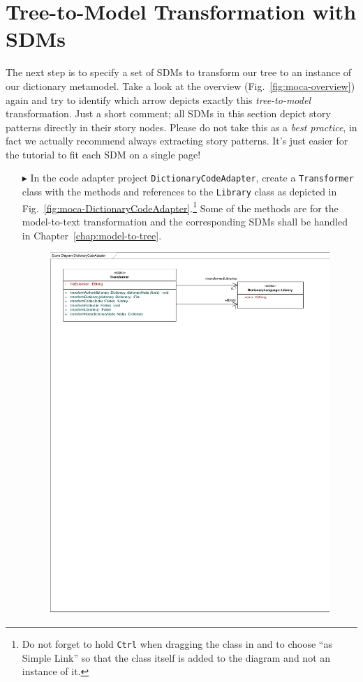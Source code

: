 \section{Tree-to-Model Transformation with SDMs}

The next step is to specify a set of SDMs to transform our tree to an instance of our dictionary metamodel.
Take a look at the overview (Fig.~\ref{fig:moca-overview}) again and try to identify which arrow depicts exactly this \emph{tree-to-model} transformation.
Just a short comment;  all SDMs in this section depict story patterns directly in their story nodes.
Please do not take this as a \emph{best practice}, in fact we actually recommend always extracting story patterns.
It's just easier for the tutorial to fit each SDM on a single page!

\begin{enumerate}
  \item[$\blacktriangleright$]  In the code adapter project
  \texttt{DictionaryCodeAdapter}, create a \texttt{Trans\-for\-mer} class with the methods and references to the \texttt{Library} class as depicted in Fig.~\ref{fig:moca-DictionaryCodeAdapter}.\footnote{Do not forget to hold \texttt{Ctrl} when dragging the class in and to choose ``as Simple Link'' so that the class itself is added to the diagram and not an instance of it.}
  Some of the methods are for the model-to-text transformation and the corresponding SDMs shall be handled in Chapter~\ref{chap:model-to-tree}.
\begin{figure}[!htbp]
\begin{center}
 \includegraphics[width=\textwidth]{pics/moca/3MocaTreeToModel/DictionaryCodeAdapter}

\end{center}
\end{figure}
\end{enumerate}
